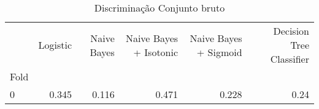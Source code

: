 \begin{table}
\centering
\caption{Discriminação Conjunto bruto}
\label{Discriminação Conjunto bruto 6}
\begin{tabular}{lrrrrr}
\toprule
{} &  Logistic &  Naive Bayes &  Naive Bayes + Isotonic &  Naive Bayes + Sigmoid &  Decision Tree Classifier \\
Fold &           &              &                         &                        &                           \\
\midrule
0    &     0.345 &        0.116 &                   0.471 &                  0.228 &                      0.24 \\
\bottomrule
\end{tabular}
\end{table}
